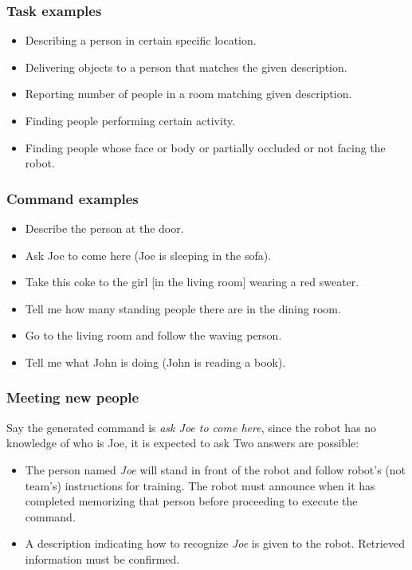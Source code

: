 \subsubsection{Task examples}
\begin{itemize}
	\item Describing a person in certain specific location.
	\item Delivering objects to a person that matches the given description.
	\item Reporting number of people in a room matching given description.
	\item Finding people performing certain activity.
	\item Finding people whose face or body or partially occluded or not facing the robot.
\end{itemize}

\subsubsection{Command examples}
\begin{itemize}
	\item Describe the person at the door.
	\item Ask Joe to come here (Joe is sleeping in the sofa).
	\item Take this coke to the girl [in the living room] wearing a red sweater.
	\item Tell me how many standing people there are in the dining room.
	\item Go to the living room and follow the waving person.
	\item Tell me what John is doing (John is reading a book).
\end{itemize}

\subsubsection{Meeting new people}
Say the generated command is \textit{ask Joe to come here}, since the robot has no knowledge of who is Joe, it is expected to ask  Two answers are possible:
\begin{itemize}
	\item {} The person named \textit{Joe} will stand in front of the robot and follow robot's (not team's) instructions for training. The robot must announce when it has completed memorizing that person before proceeding to execute the command.
	\item {} A description indicating how to recognize \textit{Joe} is given to the robot. Retrieved information must be confirmed.
\end{itemize}

